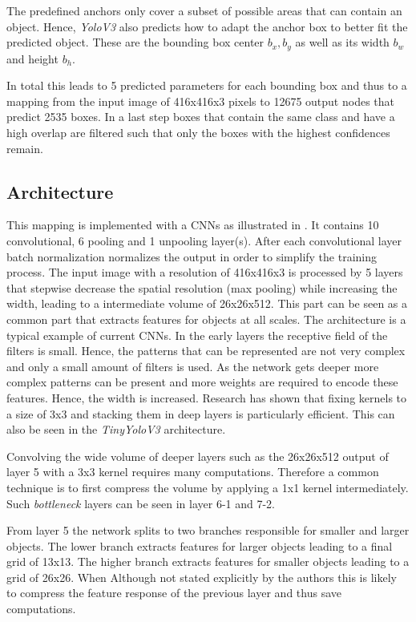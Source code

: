 The predefined anchors only cover a subset of possible areas that can contain an object. Hence, \textit{YoloV3} also predicts how to adapt the anchor box to better fit the predicted object. These are  the bounding box center $b_x,b_y$ as well as its width $b_w$ and height $b_h$. 

In total this leads to 5 predicted parameters for each bounding box and thus to a mapping from the input image of 416x416x3 pixels to 12675 output nodes that predict 2535 boxes. In a last step boxes that contain the same class and have a high overlap are filtered such that only the boxes with the highest confidences remain.	

\subsection{Architecture}

This mapping is implemented with a \acp{CNN} as illustrated in  . It contains 10 convolutional, 6 pooling and 1 unpooling layer(s). After each convolutional layer batch normalization normalizes the output in order to simplify the training process.
The input image with a resolution of 416x416x3 is processed by 5 layers that stepwise decrease the spatial resolution (max pooling) while increasing the width, leading to a intermediate volume of 26x26x512. This part can be seen as a common part that extracts features for objects at all scales. The architecture is a typical example of current \acp{CNN}. In the early layers the receptive field of the filters is small. Hence, the patterns that can be represented are not very complex and only a small amount of filters is used. As the network gets deeper more complex patterns can be present and more weights are required to encode these features. Hence, the width is increased. Research has shown that fixing kernels to a size of 3x3 and stacking them in deep layers is particularly efficient. This can also be seen in the \textit{TinyYoloV3} architecture. 

Convolving the wide volume of deeper layers such as the 26x26x512  output of layer 5 with a 3x3 kernel requires many computations. Therefore a common technique is to first compress the volume by applying a 1x1 kernel intermediately. Such \textit{bottleneck} layers can be seen in layer 6-1 and 7-2.

From layer 5 the network splits to two branches responsible for smaller and larger objects. The lower branch extracts features for larger objects leading to a final grid of 13x13. The higher branch extracts features for smaller objects leading to a grid of 26x26. When Although not stated explicitly by the authors this is likely to compress the feature response of the previous layer and thus save computations.

